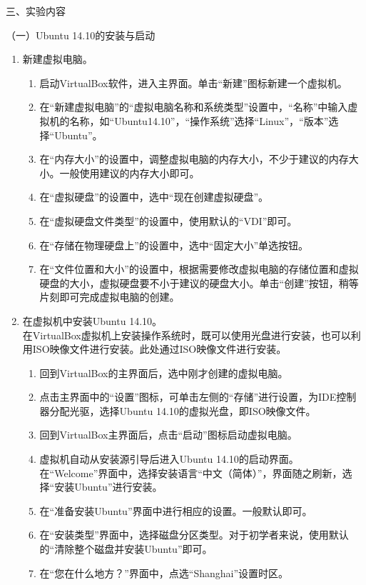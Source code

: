 \vspace{0.2in}
\noindent
三、实验内容

\vspace{0.1in}
（一）Ubuntu 14.10的安装与启动
\begin{enumerate}
  \item 新建虚拟电脑。
    \begin{enumerate}
      \item 启动VirtualBox软件，进入主界面。单击“新建”图标新建一个虚拟机。
      \item 在“新建虚拟电脑”的“虚拟电脑名称和系统类型”设置中，“名称”中输入虚拟机的名称，如“Ubuntu14.10”，“操作系统”选择“Linux”，“版本”选择“Ubuntu”。
      \item 在“内存大小”的设置中，调整虚拟电脑的内存大小，不少于建议的内存大小。一般使用建议的内存大小即可。
      \item 在“虚拟硬盘”的设置中，选中“现在创建虚拟硬盘”。
      \item 在“虚拟硬盘文件类型”的设置中，使用默认的“VDI”即可。
      \item 在“存储在物理硬盘上”的设置中，选中“固定大小”单选按钮。
      \item 在“文件位置和大小”的设置中，根据需要修改虚拟电脑的存储位置和虚拟硬盘的大小，虚拟硬盘要不小于建议的硬盘大小。单击“创建”按钮，稍等片刻即可完成虚拟电脑的创建。
    \end{enumerate}
  \item 在虚拟机中安装Ubuntu 14.10。
\\ 在VirtualBox虚拟机上安装操作系统时，既可以使用光盘进行安装，也可以利用ISO映像文件进行安装。此处通过ISO映像文件进行安装。
    \begin{enumerate}
      \item 回到VirtualBox的主界面后，选中刚才创建的虚拟电脑。
      \item 点击主界面中的“设置”图标，可单击左侧的“存储”进行设置，为IDE控制器分配光驱，选择Ubuntu 14.10的虚拟光盘，即ISO映像文件。
      \item 回到VirtualBox主界面后，点击“启动”图标启动虚拟电脑。
      \item 虚拟机自动从安装源引导后进入Ubuntu 14.10的启动界面。在“Welcome”界面中，选择安装语言“中文（简体）”，界面随之刷新，选择“安装Ubuntu”进行安装。
      \item 在“准备安装Ubuntu”界面中进行相应的设置。一般默认即可。
      \item 在“安装类型”界面中，选择磁盘分区类型。对于初学者来说，使用默认的“清除整个磁盘并安装Ubuntu”即可。
      \item 在“您在什么地方？”界面中，点选“Shanghai”设置时区。

\end{enumerate}
\end{enumerate}
